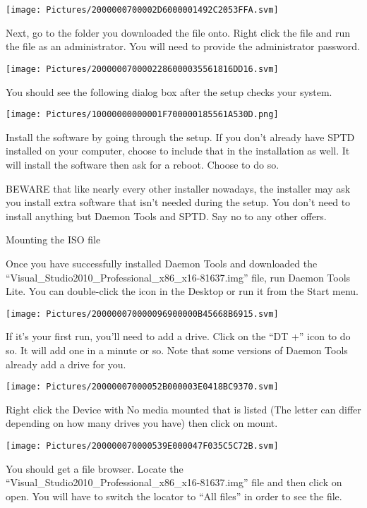 \documentclass[
]{article}
\begin{document}
\texttt{[image: Pictures/2000000700002D6000001492C2053FFA.svm]}

Next, go to the folder you downloaded the file onto. Right click the
file and run the file as an administrator. You will need to provide the
administrator password.

\texttt{[image: Pictures/2000000700002286000035561816DD16.svm]}

You should see the following dialog box after the setup checks your
system.

\texttt{[image: Pictures/10000000000001F700000185561A530D.png]}

Install the software by going through the setup. If you don't already
have SPTD installed on your computer, choose to include that in the
installation as well. It will install the software then ask for a
reboot. Choose to do so.

BEWARE that like nearly every other installer nowadays, the installer
may ask you install extra software that isn't needed during the setup.
You don't need to install anything but Daemon Tools and SPTD. Say no to
any other offers.

Mounting the ISO file

Once you have successfully installed Daemon Tools and downloaded the
``Visual\_Studio2010\_Professional\_x86\_x16-81637.img'' file, run
Daemon Tools Lite. You can double-click the icon in the Desktop or run
it from the Start menu.

\texttt{[image: Pictures/200000070000096900000B45668B6915.svm]}

If it's your first run, you'll need to add a drive. Click on the ``DT
+'' icon to do so. It will add one in a minute or so. Note that some
versions of Daemon Tools already add a drive for you.

\texttt{[image: Pictures/20000007000052B000003E0418BC9370.svm]}

Right click the Device with No media mounted that is listed (The letter
can differ depending on how many drives you have) then click on mount.

\texttt{[image: Pictures/200000070000539E000047F035C5C72B.svm]}

You should get a file browser. Locate the
``Visual\_Studio2010\_Professional\_x86\_x16-81637.img'' file and then
click on open. You will have to switch the locator to ``All files'' in
order to see the file.
\end{document}

